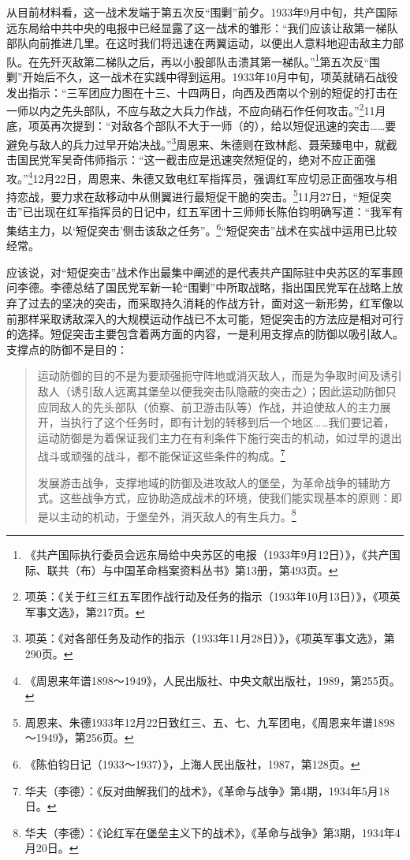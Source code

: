 从目前材料看，这一战术发端于第五次反“围剿”前夕。1933年9月中旬，共产国际远东局给中共中央的电报中已经显露了这一战术的雏形：“我们应该让敌第一梯队部队向前推进几里。在这时我们将迅速在两翼运动，以便出人意料地迎击敌主力部队。在先歼灭敌第二梯队之后，再以小股部队击溃其第一梯队。”\footnote{《共产国际执行委员会远东局给中央苏区的电报（1933年9月12日）》，《共产国际、联共（布）与中国革命档案资料丛书》第13册，第493页。}第五次反“围剿”开始后不久，这一战术在实践中得到运用。1933年10月中旬，项英就硝石战役发出指示：“三军团应力图在十三、十四两日，向西及西南以个别的短促的打击在一师以内之先头部队，不应与敌之大兵力作战，不应向硝石作任何攻击。”\footnote{项英：《关于红三红五军团作战行动及任务的指示（1933年10月13日）》，《项英军事文选》，第217页。}11月底，项英再次提到：“对敌各个部队不大于一师（的），给以短促迅速的突击……要避免与敌人的兵力过早开始决战。”\footnote{项英：《对各部任务及动作的指示（1933年11月28日）》，《项英军事文选》，第290页。}周恩来、朱德则在致林彪、聂荣臻电中，就截击国民党军吴奇伟师指示：“这一截击应是迅速突然短促的，绝对不应正面强攻。”\footnote{《周恩来年谱1898～1949》，人民出版社、中央文献出版社，1989，第255页。}12月22日，周恩来、朱德又致电红军指挥员，强调红军应切忌正面强攻与相持恋战，要力求在敌移动中从侧翼进行最短促干脆的突击。\footnote{周恩来、朱德1933年12月22日致红三、五、七、九军团电，《周恩来年谱1898～1949》，第256页。}11月27日，“短促突击”已出现在红军指挥员的日记中，红五军团十三师师长陈伯钧明确写道：“我军有集结主力，以‘短促突击’侧击该敌之任务”。\footnote{《陈伯钧日记（1933～1937）》，上海人民出版社，1987，第128页。}“短促突击”战术在实战中运用已比较经常。


应该说，对“短促突击”战术作出最集中阐述的是代表共产国际驻中央苏区的军事顾问李德。李德总结了国民党军新一轮“围剿”中所取战略，指出国民党军在战略上放弃了过去的坚决的突击，而采取持久消耗的作战方针，面对这一新形势，红军像以前那样采取诱敌深入的大规模运动作战已不太可能，短促突击的方法应是相对可行的选择。短促突击主要包含着两方面的内容，一是利用支撑点的防御以吸引敌人。支撑点的防御不是目的：

\begin{quote}

运动防御的目的不是为要顽强扼守阵地或消灭敌人，而是为争取时间及诱引敌人（诱引敌人远离其堡垒以便我突击队隐蔽的突击之）；因此运动防御只应同敌人的先头部队（侦察、前卫游击队等）作战，并迫使敌人的主力展开，当执行了这个任务时，即有计划的转移到后一个地区……我们要记着，运动防御是为着保证我们主力在有利条件下施行突击的机动，如过早的退出战斗或顽强的战斗，都不能保证这些条件的构成。\footnote{华夫（李德）：《反对曲解我们的战术》，《革命与战争》第4期，1934年5月18日。}

发展游击战争，支撑地域的防御及进攻敌人的堡垒，为革命战争的辅助方式。这些战争方式，应协助造成战术的环境，使我们能实现基本的原则：即是以主动的机动，于堡垒外，消灭敌人的有生兵力。\footnote{华夫（李德）：《论红军在堡垒主义下的战术》，《革命与战争》第3期，1934年4月20日。}
\end{quote}


